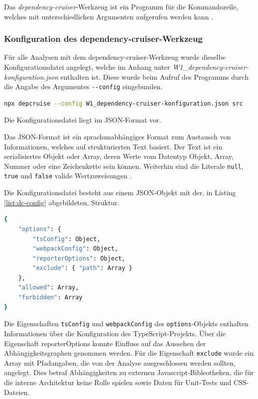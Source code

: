 Das \emph{dependency-cruiser}-Werkzeug ist ein Programm für die Kommandozeile, welches mit unterschiedlichen Argumenten aufgerufen werden kann \autocite[vgl.][]{Verweij:CLI}.

\subsubsection{Konfiguration des dependency-cruiser-Werkzeug}
Für alle Analysen mit dem dependency-cruiser-Werkzeug wurde dieselbe Konfigurationsdatei angelegt, welche im Anhang unter \emph{W1\_dependency-cruiser-konfiguration.json} enthalten ist. Diese wurde beim Aufruf des Programms durch die Angabe des Argumentes \lstinline|--config| eingebunden.
\begin{lstlisting}[language={sh}, label=depcruise-config, caption=Aufruf des \emph{dependency-cruiser} mit eingebundener Konfigurationsdatei]
    npx depcruise --config W1_dependency-cruiser-konfiguration.json src
\end{lstlisting}
Die Konfigurationsdatei liegt im JSON-Format vor. 

Das JSON-Format ist ein sprachunabhängiges Format zum Austausch von Informationen, welches auf strukturierten Text basiert. Der Text ist ein serialisiertes Objekt oder Array, deren Werte vom Datentyp Objekt, Array, Nummer oder eine Zeichenkette sein können. Weiterhin sind die Literale \lstinline|null|, \lstinline|true| und \lstinline|false| valide Wertzuweisungen \autocite[vgl.][]{JSON:Einführung}.  

Die Konfigurationsdatei besteht aus einem JSON-Objekt mit der, in Listing \ref{list:dc-config} abgebildeten, Struktur.
\begin{lstlisting}[language=sh, label=list:dc-config, caption=Struktur der Konfiguration für das dependency-cruiser-Werkzeug]
{
    "options": {
        "tsConfig": Object,
        "webpackConfig": Object,
        "reporterOptions": Object,
        "exclude": { "path": Array }
    },
    "allowed": Array,
    "forbidden": Array
}
\end{lstlisting}

Die Eigenschaften \lstinline|tsConfig| und \lstinline|webpackConfig| des \lstinline|options|-Objekts enthalten Informationen über die Konfiguration des TypeScript-Projekts. Über die Eigenschaft reporterOptions konnte Einfluss auf das Aussehen der Abhängigkeitsgraphen genommen werden. Für die Eigenschaft \lstinline|exclude| wurde ein Array mit Pfadangaben, die von der Analyse ausgeschlossen werden sollten, angelegt. Dies betraf Abhängigkeiten zu externen Javascript-Bibleotheken, die für die interne Architektur keine Rolle spielen sowie Daten für Unit-Tests und CSS-Dateien. 


